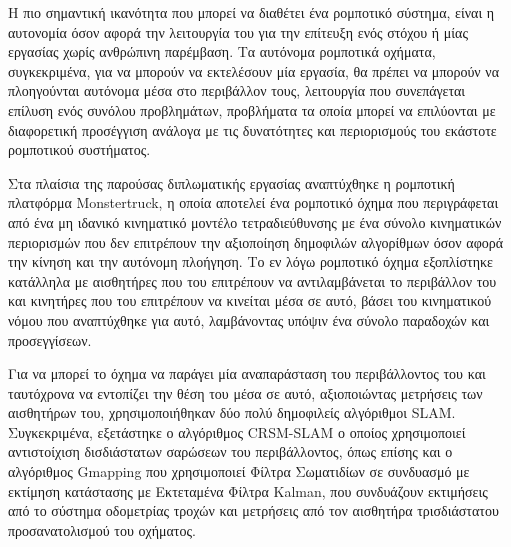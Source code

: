 \documentclass[
11pt, %
twoside, %
openright,
english,
headsepline, %
]{MastersDoctoralThesis} %
\begin{document}
\mbox{}
\thispagestyle{empty}
\newpage


\begin{summary}
Η πιο σημαντική ικανότητα που μπορεί να διαθέτει ένα ρομποτικό σύστημα, είναι η αυτονομία όσον αφορά την λειτουργία του για την επίτευξη ενός στόχου ή μίας εργασίας χωρίς ανθρώπινη παρέμβαση. Τα αυτόνομα ρομποτικά οχήματα, συγκεκριμένα, για να μπορούν να εκτελέσουν μία εργασία, θα πρέπει να μπορούν να πλοηγούνται αυτόνομα μέσα στο περιβάλλον τους, λειτουργία που συνεπάγεται επίλυση ενός συνόλου προβλημάτων, προβλήματα τα οποία μπορεί να επιλύονται με διαφορετική προσέγγιση ανάλογα με τις δυνατότητες και περιορισμούς του εκάστοτε ρομποτικού συστήματος.

\bigskip
Στα πλαίσια της παρούσας διπλωματικής εργασίας αναπτύχθηκε η ρομποτική πλατφόρμα Monstertruck, η οποία αποτελεί ένα ρομποτικό όχημα που περιγράφεται από ένα μη ιδανικό κινηματικό μοντέλο τετραδιεύθυνσης με ένα σύνολο κινηματικών περιορισμών που δεν επιτρέπουν την αξιοποίηση δημοφιλών αλγορίθμων όσον αφορά την κίνηση και την αυτόνομη πλοήγηση. Το εν λόγω ρομποτικό όχημα εξοπλίστηκε κατάλληλα με αισθητήρες που του επιτρέπουν να αντιλαμβάνεται το περιβάλλον του και κινητήρες που του επιτρέπουν να κινείται μέσα σε αυτό, βάσει του κινηματικού νόμου που αναπτύχθηκε για αυτό, λαμβάνοντας υπόψιν ένα σύνολο παραδοχών και προσεγγίσεων.

\bigskip
Για να μπορεί το όχημα να παράγει μία αναπαράσταση του περιβάλλοντος του και ταυτόχρονα να εντοπίζει την θέση του μέσα σε αυτό, αξιοποιώντας μετρήσεις των αισθητήρων του, χρησιμοποιήθηκαν δύο πολύ δημοφιλείς αλγόριθμοι SLAM. Συγκεκριμένα, εξετάστηκε ο αλγόριθμος CRSM-SLAM ο οποίος χρησιμοποιεί αντιστοίχιση δισδιάστατων σαρώσεων του περιβάλλοντος, όπως επίσης και ο αλγόριθμος Gmapping που χρησιμοποιεί Φίλτρα Σωματιδίων σε συνδυασμό με εκτίμηση κατάστασης με Εκτεταμένα Φίλτρα Kalman, που συνδυάζουν εκτιμήσεις από το σύστημα οδομετρίας τροχών και μετρήσεις από τον αισθητήρα τρισδιάστατου προσανατολισμού του οχήματος.


\end{summary}
\end{document}
